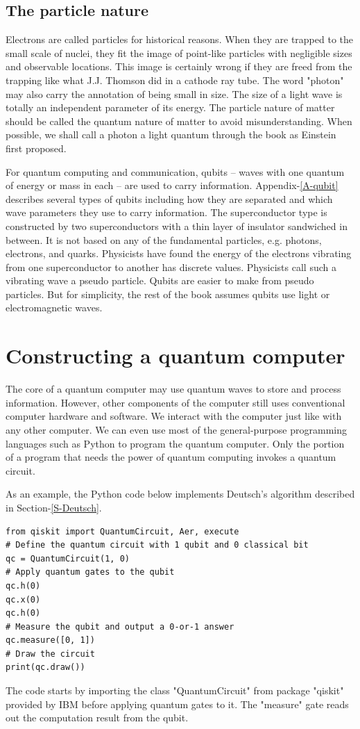 \documentclass[oneside, letter, 12pt]{book}
\begin{document}
\subsection{The particle nature}
Electrons are called particles for historical reasons. When they are trapped to the small scale of nuclei, they fit the image of point-like particles with negligible sizes and observable locations. This image is certainly wrong if they are freed from the trapping like what J.J. Thomson did in a cathode ray tube. The word "photon" may also carry the annotation of being small in size. The size of a light wave is totally an independent parameter of its energy. The particle nature of matter should be called the quantum nature of matter to avoid misunderstanding. When possible, we shall call a photon a light quantum through the book as Einstein first proposed.

For quantum computing and communication, qubits -- waves with one quantum of energy or mass in each -- are used to carry information. Appendix-\ref{A-qubit} describes several types of qubits including how they are separated and which wave parameters they use to carry information. The superconductor type is constructed by two superconductors with a thin layer of insulator sandwiched in between. It is not based on any of the fundamental particles, e.g. photons, electrons, and quarks. Physicists have found the energy of the electrons vibrating from one superconductor to another has discrete values. Physicists call such a vibrating wave a pseudo particle. Qubits are easier to make from pseudo particles. But for simplicity, the rest of the book assumes qubits use light or electromagnetic waves.

\section{Constructing a quantum computer}
The core of a quantum computer may use quantum waves to store and process information. However, other components of the computer still uses conventional computer hardware and software. We interact with the computer just like with any other computer. We can even use most of the general-purpose programming languages such as Python to program the quantum computer. Only the portion of a program that needs the power of quantum computing invokes a quantum circuit.

As an example, the Python code below implements Deutsch's algorithm described in Section-\ref{S-Deutsch}.
\begin{lstlisting}
from qiskit import QuantumCircuit, Aer, execute
# Define the quantum circuit with 1 qubit and 0 classical bit
qc = QuantumCircuit(1, 0)
# Apply quantum gates to the qubit
qc.h(0)
qc.x(0)
qc.h(0)
# Measure the qubit and output a 0-or-1 answer
qc.measure([0, 1])
# Draw the circuit
print(qc.draw())
\end{lstlisting}
The code starts by importing the class "QuantumCircuit" from package "qiskit" provided by IBM before applying quantum gates to it. The "measure" gate reads out the computation result from the qubit. 
\end{document}
